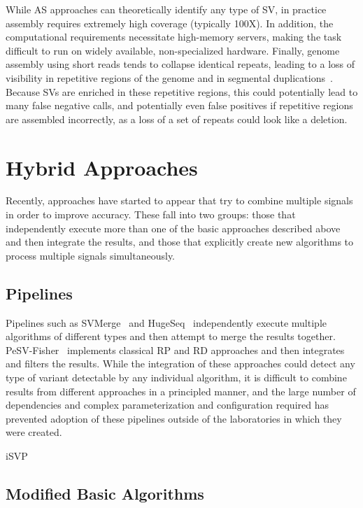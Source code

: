 While AS approaches can theoretically identify any type of SV, in practice assembly requires extremely high coverage (typically 100X). In addition, the computational requirements necessitate high-memory servers, making the task difficult to run on widely available, non-specialized hardware. Finally, genome assembly using short reads tends to collapse identical repeats, leading to a loss of visibility in repetitive regions of the genome and in segmental duplications~\cite{Alkan:2011hs}. Because SVs are enriched in these repetitive regions, this could potentially lead to many false negative calls, and potentially even false positives if repetitive regions are assembled incorrectly, as a loss of a set of repeats could look like a deletion.

\section{Hybrid Approaches}

Recently, approaches have started to appear that try to combine multiple signals in order to improve accuracy. These fall into two groups: those that independently execute more than one of the basic approaches described above and then integrate the results, and those that explicitly create new algorithms to process multiple signals simultaneously.

\subsection{Pipelines}

Pipelines such as SVMerge~\cite{Wong:2010p1271} and HugeSeq~\cite{Lam:2012jy} independently execute multiple algorithms of different types and then attempt to merge the results together. PeSV-Fisher~\cite{Escaramis:2013dm} implements classical RP and RD approaches and then integrates and filters the results. While the integration of these approaches could detect any type of variant detectable by any individual algorithm, it is difficult to combine results from different approaches in a principled manner, and the large number of dependencies and complex parameterization and configuration required has prevented adoption of these pipelines outside of the laboratories in which they were created.

iSVP

\subsection{Modified Basic Algorithms}

